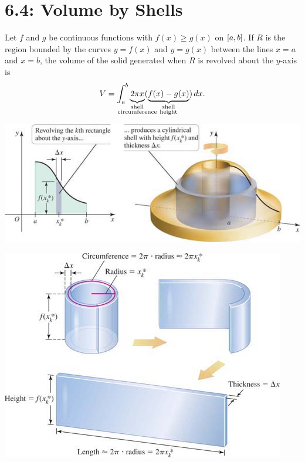 \documentclass[../mathNotesPreamble]{subfiles}
\begin{document}
  \section{6.4: Volume by Shells}

  \begin{thmBox*}
    Let $f$ and $g$ be continuous functions with $f(x)\geq g(x)$ on ${\left[a,b\right]}$. If $R$ is the region bounded by the curves $y=f(x)$ and $y=g(x)$ between the lines $x=a$ and $x=b$, the volume of the solid generated when $R$ is revolved about the $y$-axis is
      \[V=\int_a^b \underbrace{2\pi x\vphantom{)}}_{\substack{\textnormal{shell}\\\mathclap{\textnormal{circumference}}}} (\underbrace{f(x)-g(x)}_{\substack{\textnormal{shell}\\\textnormal{height}}})\,dx.\]
  \end{thmBox*}
  \begin{center}
    \includegraphics[width=0.6\linewidth]{../images/briggs_06_04/fig06_40}

    \includegraphics[width=0.5\linewidth]{../images/briggs_06_04/fig06_41}
  \end{center}
  \pagebreak
\end{document}
